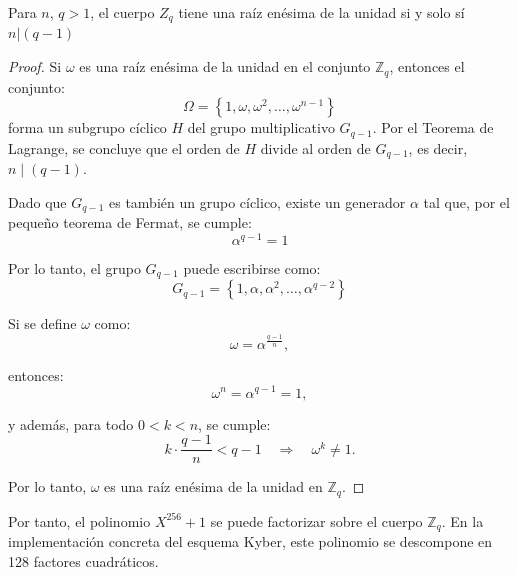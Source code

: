 \begin{theorem}
	Para \(n\), \(q>1\), el cuerpo  \(Z_q\) tiene una raíz enésima de la unidad si y solo sí \(n| (q-1)\)
\end{theorem} 
\begin{proof}
	Si \(\omega\) es una raíz enésima de la unidad en el conjunto \( \mathbb{Z}_q \), entonces el conjunto:
	\begin{equation}
		\Omega = \left\{1, \omega, \omega^2, \dots, \omega^{n-1} \right\}
	\end{equation}
	forma un subgrupo cíclico \( H \) del grupo multiplicativo \( G_{q-1} \). Por el Teorema de Lagrange, se concluye que el orden de \( H \) divide al orden de \( G_{q-1} \), es decir, \( n \mid (q-1) \).
	\newline
	
	Dado que \( G_{q-1} \) es también un grupo cíclico, existe un generador \(\alpha\) tal que, por el pequeño teorema de Fermat, se cumple:
	\begin{equation}
		\alpha^{q-1} = 1
	\end{equation}
	
	Por lo tanto, el grupo \( G_{q-1} \) puede escribirse como:
	\begin{equation}
		G_{q-1} = \left\{1, \alpha, \alpha^2, \dots, \alpha^{q-2} \right\}
	\end{equation}
	
	Si se define \(\omega\) como:
	\begin{equation}
		\omega = \alpha^{\frac{q-1}{n}},
	\end{equation}
	
	entonces:
	\begin{equation}
		\omega^n = \alpha^{q-1} = 1,
	\end{equation}
	
	y además, para todo \( 0 < k < n \), se cumple:
	\begin{equation}
		k \cdot \frac{q-1}{n} < q-1 \quad \Rightarrow \quad \omega^k \neq 1.
	\end{equation}
	
	Por lo tanto, \(\omega\) es una raíz enésima de la unidad en \(\mathbb{Z}_q\).
\end{proof}
\newpage

Por tanto, el polinomio \(X^{256} + 1\) se puede factorizar sobre el cuerpo \(\mathbb{Z}_q\). En la implementación concreta del esquema Kyber, este polinomio se descompone en 128 factores cuadráticos.
\newline

